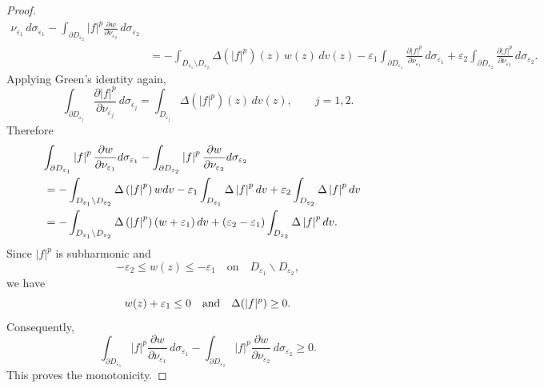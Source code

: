 \documentclass[10pt,a4paper]{amsart}
\begin{document}
\begin{proof}
\begin{align*}
{\nu_{\varepsilon_{1}}}\,d\sigma_{\varepsilon_{1}}-\int_{\partial
D_{\varepsilon_{2}}}|f|^{p}\frac{\partial w}{\partial\nu_{\varepsilon_{2}}%
}\,d\sigma_{\varepsilon_{2}}\\
&  =-\int_{D_{\varepsilon_{1}}\setminus D_{\varepsilon_{2}}}\Delta
(|f|^{p})(z)\,w(z)\,dv(z)-\varepsilon_{1}\int_{\partial D_{\varepsilon_{1}}%
}\frac{\partial|f|^{p}}{\partial\nu_{\varepsilon_{1}}}\,d\sigma_{\varepsilon
_{1}}+\varepsilon_{2}\int_{\partial D_{\varepsilon_{2}}}\frac{\partial|f|^{p}%
}{\partial\nu_{\varepsilon_{2}}}\,d\sigma_{\varepsilon_{2}}.
\end{align*}
Applying Green's identity again,
\[
\int_{\partial D_{\varepsilon_{j}}}\frac{\partial|f|^{p}}{\partial
\nu_{\varepsilon_{j}}}\,d\sigma_{\epsilon_j}=\int_{D_{\varepsilon_{j}}}\Delta
(|f|^{p})(z)\,dv(z),\qquad j=1,2.
\]
Therefore
\begin{align*}
\lefteqn{\int_{\partial D_{\varepsilon_{1}}}\left\vert f\right\vert ^{p}%
\frac{\partial w}{\partial\nu_{\varepsilon_{1}}}d\sigma_{\varepsilon_{1}}%
-\int_{\partial D_{\varepsilon_{2}}}\left\vert f\right\vert ^{p}\frac{\partial
w}{\partial\nu_{\varepsilon_{2}}}d\sigma_{\varepsilon_{2}}}\\
&  =-\int_{D_{\varepsilon_{1}}\backslash D_{\varepsilon_{2}}}\Delta\left(
\left\vert f\right\vert ^{p}\right)  wdv-\varepsilon_{1}\int_{D_{\varepsilon
_{1}}}\Delta\left\vert f\right\vert ^{p}dv+\varepsilon_{2}\int_{D_{\varepsilon
_{2}}}\Delta\left\vert f\right\vert ^{p}dv\\
&  =-\int_{D_{\varepsilon_{1}}\backslash D_{\varepsilon_{2}}}\Delta\left(
\left\vert f\right\vert ^{p}\right)  \left(  w+\varepsilon_{1}\right)
dv+\left(  \varepsilon_{2}-\varepsilon_{1}\right)  \int_{D_{\varepsilon_{2}}%
}\Delta\left\vert f\right\vert ^{p}dv.
\end{align*}
Since $|f|^{p}$ is subharmonic and
\[
-\varepsilon_{2}\leq w(z)\leq-\varepsilon_{1}\quad\mbox{on}\quad
D_{\varepsilon_{1}}\backslash D_{\varepsilon_{2}},
\]
we have
\[
w(z)+\varepsilon_{1}\leq0\quad\hbox{and}\quad\Delta(|f|^{p})\geq0.
\]
Consequently,
\[
\int_{\partial D_{\varepsilon_{1}}}|f|^{p}\frac{\partial w}{\partial
\nu_{\varepsilon_{1}}}\,d\sigma_{\varepsilon_{1}}-\int_{\partial
D_{\varepsilon_{2}}}|f|^{p}\frac{\partial w}{\partial\nu_{\varepsilon_{2}}%
}\,d\sigma_{\varepsilon_{2}}\geq0.
\]
This proves the monotonicity.
\end{proof}
\end{document}
